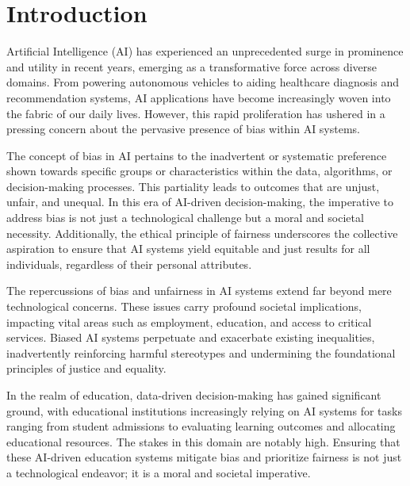 \documentclass[12pt,a4paper,openright,twoside]{book}
\begin{document}
\mainmatter

\chapter{Introduction}
\label{chap:introduction}

Artificial Intelligence (AI) has experienced an unprecedented surge in prominence and utility in recent years, emerging as a transformative force across diverse domains. From powering autonomous vehicles to aiding healthcare diagnosis and recommendation systems, AI applications have become increasingly woven into the fabric of our daily lives. However, this rapid proliferation has ushered in a pressing concern about the pervasive presence of bias within AI systems.

The concept of bias in AI pertains to the inadvertent or systematic preference shown towards specific groups or characteristics within the data, algorithms, or decision-making processes. This partiality leads to outcomes that are unjust, unfair, and unequal. In this era of AI-driven decision-making, the imperative to address bias is not just a technological challenge but a moral and societal necessity. Additionally, the ethical principle of fairness underscores the collective aspiration to ensure that AI systems yield equitable and just results for all individuals, regardless of their personal attributes.

The repercussions of bias and unfairness in AI systems extend far beyond mere technological concerns. These issues carry profound societal implications, impacting vital areas such as employment, education, and access to critical services. Biased AI systems perpetuate and exacerbate existing inequalities, inadvertently reinforcing harmful stereotypes and undermining the foundational principles of justice and equality.

In the realm of education, data-driven decision-making has gained significant ground, with educational institutions increasingly relying on AI systems for tasks ranging from student admissions to evaluating learning outcomes and allocating educational resources. The stakes in this domain are notably high. Ensuring that these AI-driven education systems mitigate bias and prioritize fairness is not just a technological endeavor; it is a moral and societal imperative.
\end{document}
